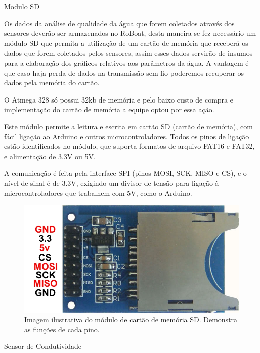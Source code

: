 Modulo SD 


Os dados da análise de qualidade da água que forem coletados através dos sensores deverão ser armazenados no RoBoat, desta maneira se fez necessário um módulo SD que permita a utilização de um cartão de memória que receberá os dados que forem coletados pelos sensores, assim esses dados servirão de insumos para a elaboração dos gráficos relativos aos parâmetros da água. A vantagem é que caso haja perda de dados na transmissão sem fio poderemos recuperar os dados pela memória do cartão.

O Atmega 328 só possui 32kb de memória e pelo baixo custo de compra e implementação do cartão de memória a equipe optou por essa ação.

Este módulo permite a leitura e escrita em cartão SD (cartão de memória), com fácil ligação ao Arduino e outros microcontroladores. Todos os pinos de ligação estão identificados no módulo, que suporta formatos de arquivo FAT16 e FAT32, e alimentação de 3.3V ou 5V.

A comunicação é feita pela interface SPI (pinos MOSI, SCK, MISO e CS), e o nível de sinal é de 3.3V, exigindo um divisor de tensão para ligação à microcontroladores que trabalhem com 5V, como o Arduino.
\FloatBarrier
 \begin{figure} [!htp]
	\centering
	\includegraphics[scale=0.6]{figuras/cartaosdpinagem}
	\caption{Imagem ilustrativa do módulo de cartão de memória SD. Demonstra as funções de cada pino.}
	\label{cartaosdpinagem}
\end{figure}
\FloatBarrier

Sensor de Condutividade

